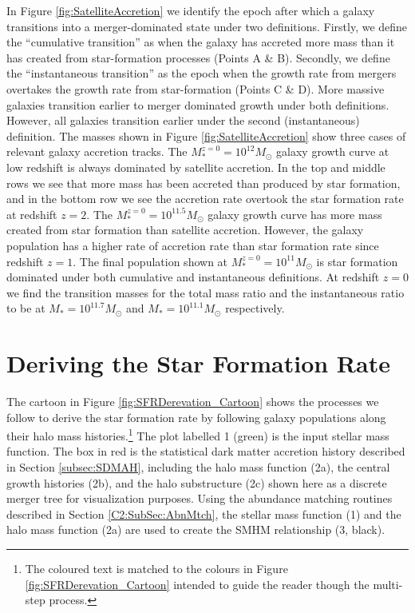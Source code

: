In Figure \ref{fig:SatelliteAccretion} we identify the epoch after which a galaxy transitions into a merger-dominated state under two definitions. Firstly, we define the ``cumulative transition'' as when the galaxy has accreted more mass than it has created from star-formation processes (Points A \& B). Secondly, we define the ``instantaneous transition'' as  the epoch when the growth rate from mergers overtakes the growth rate from star-formation (Points C \& D). More massive galaxies transition earlier to merger dominated growth under both definitions. However, all galaxies transition earlier under the second (instantaneous) definition. The masses shown in Figure \ref{fig:SatelliteAccretion} show three cases of relevant galaxy accretion tracks. The $M^{z=0}_* = 10^{12} M_{\odot}$ galaxy growth curve at low redshift is always dominated by satellite accretion. In the top and middle rows we see that more mass has been accreted than produced by star formation, and in the bottom row we see the accretion rate overtook the star formation rate at redshift $z=2$. The $M^{z=0}_* = 10^{11.5} M_{\odot}$ galaxy growth curve has more mass created from star formation than satellite accretion. However, the galaxy population has a higher rate of accretion rate than star formation rate since redshift $z = 1$. The final population shown at $M^{z=0}_* = 10^{11} M_{\odot}$ is star formation dominated under both cumulative and instantaneous definitions. At redshift $z = 0$ we find the transition masses for the total mass ratio and the instantaneous ratio to be at $M_* = 10^{11.7} M_{\odot}$ and $M_* = 10^{11.1} M_{\odot}$ respectively.

\section{Deriving the Star Formation Rate}
\label{sec:SFR_Dev}

The cartoon in Figure \ref{fig:SFRDerevation_Cartoon} shows the processes we follow to derive the star formation rate by following galaxy populations along their halo mass histories.\footnote{The coloured text is matched to the colours in Figure \ref{fig:SFRDerevation_Cartoon} intended to guide the reader though the multi-step process.} \textcolor{MPLgreen}{The plot labelled 1 (green) is the input stellar mass function.} \textcolor{MPLred}{The box in red is the statistical dark matter accretion history described in Section \ref{subsec:SDMAH}, including the halo mass function (2a), the central growth histories (2b), and the halo substructure (2c) shown here as a discrete merger tree for visualization purposes.} Using the abundance matching routines described in Section \ref{C2:SubSec:AbnMtch}, the \textcolor{MPLgreen}{stellar mass function (1)} and the \textcolor{MPLred}{halo mass function (2a)} are used to create the SMHM relationship (3, black).


